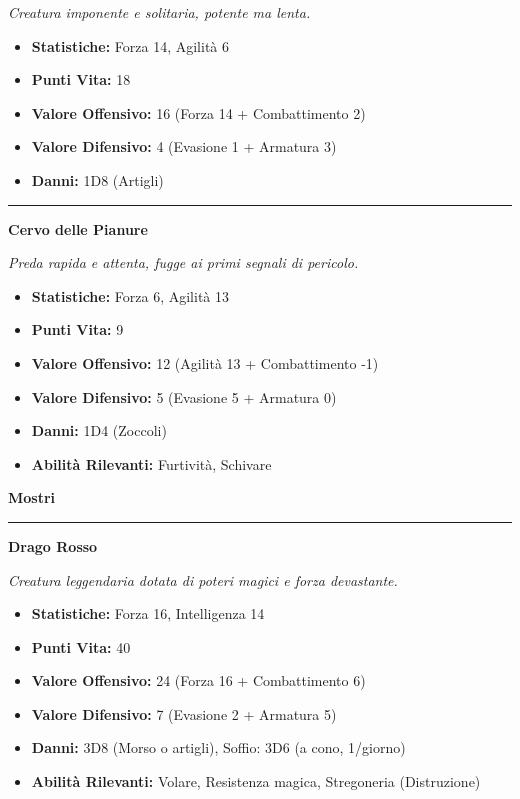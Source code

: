 \documentclass[../manuale_main.tex]{subfiles}
\begin{document}
\textit{Creatura imponente e solitaria, potente ma lenta.}
\begin{itemize}
\item \textbf{Statistiche:} Forza 14, Agilità 6
\item \textbf{Punti Vita:} 18
\item \textbf{Valore Offensivo:} 16 (Forza 14 + Combattimento 2)
\item \textbf{Valore Difensivo:} 4 (Evasione 1 + Armatura 3)
\item \textbf{Danni:} 1D8 (Artigli)
\end{itemize}
\vspace{0.2cm}
\noindent
\begin{center}
\rule{\textwidth}{0.4pt} 
\end{center}
\clearpage
{\zarafirtitlefont\Large\bfseries\noindent Cervo delle Pianure}
\vspace{0.2cm}


\textit{Preda rapida e attenta, fugge ai primi segnali di pericolo.}
\begin{itemize}
\item \textbf{Statistiche:} Forza 6, Agilità 13
\item \textbf{Punti Vita:} 9
\item \textbf{Valore Offensivo:} 12 (Agilità 13 + Combattimento -1)
\item \textbf{Valore Difensivo:} 5 (Evasione 5 + Armatura 0)
\item \textbf{Danni:} 1D4 (Zoccoli)
\item \textbf{Abilità Rilevanti:} Furtività, Schivare
\end{itemize}

\vspace{0.5cm}
{\zarafirtitlefont\Large\bfseries Mostri}

\vspace{0.2cm}
\noindent
\begin{center}
\rule{\textwidth}{0.4pt} 
\end{center}
\vspace{0.2cm}

{\zarafirtitlefont\Large\bfseries\noindent Drago Rosso}
\vspace{0.2cm}



\textit{Creatura leggendaria dotata di poteri magici e forza devastante.}
\begin{itemize}
\item \textbf{Statistiche:} Forza 16, Intelligenza 14
\item \textbf{Punti Vita:} 40
\item \textbf{Valore Offensivo:} 24 (Forza 16 + Combattimento 6)
\item \textbf{Valore Difensivo:} 7 (Evasione 2 + Armatura 5)
\item \textbf{Danni:} 3D8 (Morso o artigli), Soffio: 3D6 (a cono, 1/giorno)
\item \textbf{Abilità Rilevanti:} Volare, Resistenza magica, Stregoneria (Distruzione)
\end{itemize}
\end{document}
